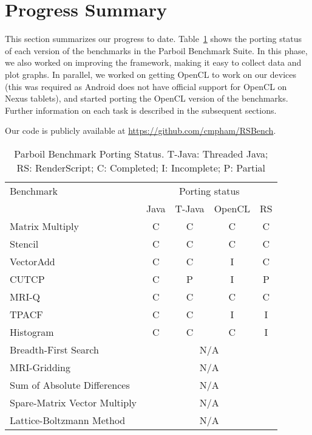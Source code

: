 \section*{Progress Summary}

This section summarizes our progress to date. Table~\ref{table:parboil} shows the
porting status of each version of the benchmarks in the Parboil Benchmark Suite.
In this phase, we also worked on improving the framework, making it easy to collect
data and plot graphs. In parallel, we worked on getting OpenCL to work on our
devices (this was required as Android does not have official support for OpenCL
on Nexus tablets), and started porting the OpenCL version of the benchmarks. 
Further information on each task is described in the subsequent sections.

Our code is publicly available at \url{https://github.com/cmpham/RSBench}.

\begin{table}[h]\small
\centering
\begin{tabular}{ | l | c | c | c | c |}
    \hline 
    Benchmark & \multicolumn{4}{|c|}{Porting status} \\ \cline{2-5}
              & Java & T-Java & OpenCL & RS \\ \hline
    Matrix Multiply & C & C & C & C \\ \hline
    Stencil & C & C & C & C \\ \hline
    VectorAdd & C & C & I & C \\ \hline
    CUTCP & C & P  & I  & P \\ \hline
    MRI-Q & C & C & C & C \\ \hline
    TPACF & C & C & I & I \\ \hline
    Histogram & C & C & C & I \\ \hline
    Breadth-First Search & \multicolumn{4}{|c|}{N/A} \\ \hline
    MRI-Gridding & \multicolumn{4}{|c|}{N/A} \\ \hline
    Sum of Absolute Differences & \multicolumn{4}{|c|}{N/A} \\ \hline
    Spare-Matrix Vector Multiply & \multicolumn{4}{|c|}{N/A} \\ \hline
    Lattice-Boltzmann Method & \multicolumn{4}{|c|}{N/A} \\ \hline
    \hline
\end{tabular}
\caption{Parboil Benchmark Porting Status. T-Java: Threaded Java; RS:
RenderScript; C: Completed; I: Incomplete; P: Partial}
\label{table:parboil}
\end{table}

